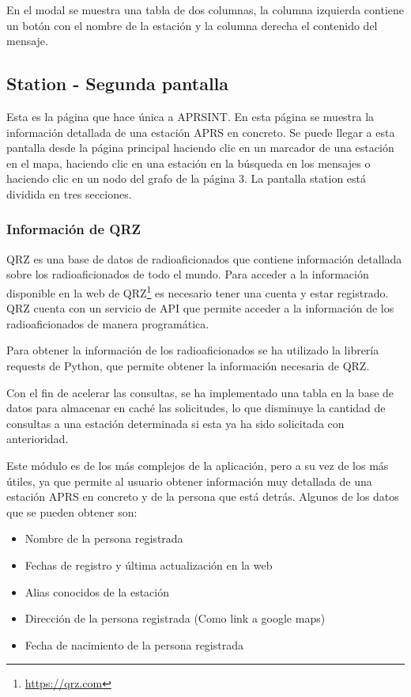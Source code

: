 \noindent En el modal se muestra una tabla de dos columnas, la columna izquierda contiene un botón con el nombre de la estación y la columna derecha el contenido del mensaje.

\subsection{Station - Segunda pantalla}
Esta es la página que hace única a APRSINT. En esta página se muestra la información detallada de una estación APRS en concreto. Se puede llegar a esta pantalla desde la página principal haciendo clic en un marcador de una estación en el mapa, haciendo clic en una estación en la búsqueda en los mensajes o haciendo clic en un nodo del grafo de la página 3. La pantalla station está dividida en tres secciones.

\subsubsection*{Información de QRZ}
QRZ es una base de datos de radioaficionados que contiene información detallada sobre los radioaficionados de todo el mundo. Para acceder a la información disponible en la web de QRZ\footnote{\url{https://qrz.com}} es necesario tener una cuenta y estar registrado. QRZ cuenta con un servicio de API que permite acceder a la información de los radioaficionados de manera programática.

Para obtener la información de los radioaficionados se ha utilizado la librería requests de Python, que permite obtener la información necesaria de QRZ.

Con el fin de acelerar las consultas, se ha implementado una tabla en la base de datos para almacenar en caché las solicitudes, lo que disminuye la cantidad de consultas a una estación determinada si esta ya ha sido solicitada con anterioridad.

Este módulo es de los más complejos de la aplicación, pero a su vez de los más útiles, ya que permite al usuario obtener información muy detallada de una estación APRS en concreto y de la persona que está detrás. Algunos de los datos que se pueden obtener son:

\begin{itemize}
	\item Nombre de la persona registrada
	\item Fechas de registro y última actualización en la web
	\item Alias conocidos de la estación
	\item Dirección de la persona registrada (Como link a google maps)
	\item Fecha de nacimiento de la persona registrada
\end{itemize}

